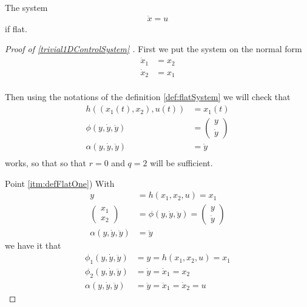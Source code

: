 \documentclass[12pt]{article}
\begin{document}
\begin{example}\label{trivial2DControlSystem}
  The system
  \begin{equation}\begin{aligned}
    \ddot{x} = u
  \end{aligned}\end{equation}
  if flat.
\end{example}
\begin{proof}[ Proof  of \ref{trivial1DControlSystem} ]
  First we put the system on the normal form
  \begin{equation}\begin{aligned}
    \dot{x}_1 &= x_2 \\
    \dot{x}_2 &= x_1 \\
  \end{aligned}\end{equation}
  
  Then using the notations of the definition \ref{def:flatSystem} we will check that
  \begin{equation}\begin{aligned}
    h( (x_1(t),x_2),u(t)) &= x_1(t) \\
    \phi(y, \dot{y}, \ddot{y}) &= \begin{pmatrix} y \\ \dot{y} \end{pmatrix} \\
    \alpha(y, \dot{y}, \ddot{y}) &=  \ddot{y} \\
  \end{aligned}\end{equation}
  works, so that so that $r=0$ and $q=2$ will be sufficient.
  
  Point \ref{itm:defFlatOne}) With
  \begin{equation}\begin{aligned}
    y &= h( x_1, x_2, u) = x_1 \\
    \begin{pmatrix} x_1 \\ x_2 \end{pmatrix}
    &= \phi(y, \dot{y}, \ddot{y})
    = \begin{pmatrix} y \\ \dot{y} \end{pmatrix} \\
    \alpha(y,\dot{y},\ddot{y}) &= \ddot{y}
  \end{aligned}\end{equation}
  we have it that
  \begin{equation}\begin{aligned}
    \phi_1(y,\dot{y},\ddot{y}) &= y = h(x_1,x_2,u) = x_1 \\
    \phi_2(y,\dot{y},\ddot{y}) &= \dot{y} = \dot{x}_1 = x_2 \\
    \alpha(y,\dot{y},\ddot{y}) &= \ddot{y} = \ddot{x}_1 = \dot{x}_2 = u
  \end{aligned}\end{equation}
  

\end{proof}
\end{document}
